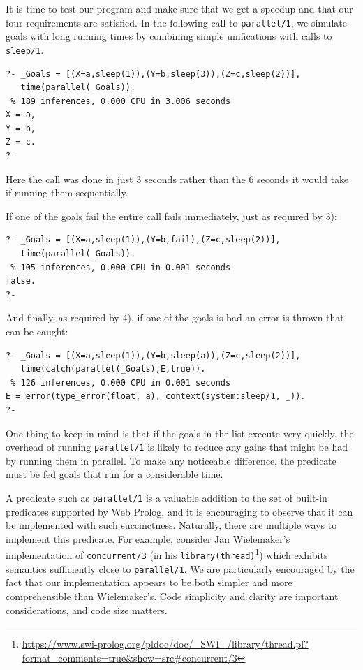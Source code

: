 It is time to test our program and make sure that we get a speedup and that our four requirements are satisfied. In the following call to \texttt{parallel/1}, we simulate goals with long running times by combining simple unifications with calls to \texttt{sleep/1}. 

\begin{verbatim}
?- _Goals = [(X=a,sleep(1)),(Y=b,sleep(3)),(Z=c,sleep(2))],
   time(parallel(_Goals)).
 % 189 inferences, 0.000 CPU in 3.006 seconds
X = a,
Y = b,
Z = c.
?-
\end{verbatim}

\noindent Here the call was done in just 3 seconds rather than the 6 seconds it would take if running them sequentially. 

If one of the goals fail the entire call fails immediately, just as required by 3):

\begin{verbatim}    
?- _Goals = [(X=a,sleep(1)),(Y=b,fail),(Z=c,sleep(2))],
   time(parallel(_Goals)).
 % 105 inferences, 0.000 CPU in 0.001 seconds  
false.
?-
\end{verbatim}

\noindent And finally, as required by 4), if one of the goals is bad an error is thrown that can be caught:

\begin{verbatim}   
?- _Goals = [(X=a,sleep(1)),(Y=b,sleep(a)),(Z=c,sleep(2))],
   time(catch(parallel(_Goals),E,true)).
 % 126 inferences, 0.000 CPU in 0.001 seconds 
E = error(type_error(float, a), context(system:sleep/1, _)).
?-
\end{verbatim}

\noindent One thing to keep in mind is that if the goals in the list execute very quickly, the overhead of running \texttt{parallel/1} is likely to reduce any gains that might be had by running them in parallel. To make any noticeable difference, the predicate must be fed goals that run for a considerable time.

A predicate such as \texttt{parallel/1} is a valuable addition to the set of built-in predicates supported by Web Prolog, and it is encouraging to observe that it can be implemented with such succinctness. Naturally, there are multiple ways to implement this predicate. For example, consider Jan Wielemaker's implementation of \texttt{concurrent/3} (in his \texttt{library(thread)}\footnote{\url{https://www.swi-prolog.org/pldoc/doc/\_SWI\_/library/thread.pl?format\_comments=true\&show=src\#concurrent/3}}) which exhibits semantics sufficiently close to \texttt{parallel/1}. We are particularly encouraged by the fact that our implementation appears to be both simpler and more comprehensible than Wielemaker's. Code simplicity and clarity are important considerations, and code size matters.

